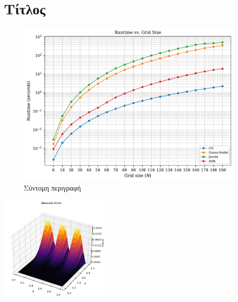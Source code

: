 \section{Τίτλος}

\begin{figure}[h!]
    \centering
    \includegraphics[width=0.50\linewidth]{doc/figures/runtime_gridsize.pdf}
    \caption{Σύντομη περιγραφή}
    \label{fig:placeholder}
\end{figure}

\begin{image}
    \centering
    \includegraphics[width=0.40\textwidth]{doc/images/abs_error_surface.pdf}
    \caption{Σύντομη περιγραφή}
    \label{img:example}
\end{image}


